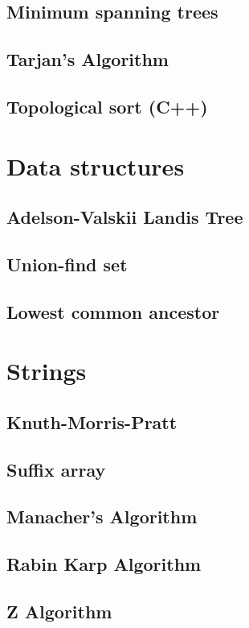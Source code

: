 \subsection{Minimum spanning trees}
\raggedbottom
\hrulefill
\subsection{Tarjan's Algorithm}
\raggedbottom
\hrulefill
\subsection{Topological sort (C++)}
\raggedbottom
\hrulefill

\section{Data structures}
\subsection{Adelson-Valskii Landis Tree}
\raggedbottom
\hrulefill
\subsection{Union-find set}
\raggedbottom
\hrulefill
\subsection{Lowest common ancestor}
\raggedbottom
\hrulefill

\section{Strings}
\subsection{Knuth-Morris-Pratt}
\raggedbottom
\hrulefill
\subsection{Suffix array}
\raggedbottom
\hrulefill
\subsection{Manacher's Algorithm}
\raggedbottom
\hrulefill
\subsection{Rabin Karp Algorithm}
\raggedbottom
\hrulefill
\subsection{Z Algorithm}
\raggedbottom
\hrulefill

